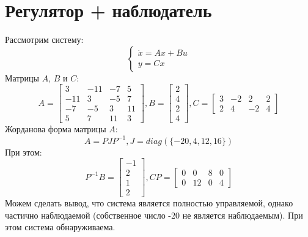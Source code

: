 \pagebreak

\section{Регулятор + наблюдатель}
Рассмотрим систему:
\begin{equation}
    \begin{cases}
        \dot x = Ax + Bu \\
        y = Cx
    \end{cases}
\end{equation}
Матрицы $A$, $B$ и $C$:
\begin{equation*}
    A = \begin{bmatrix}
        3 & -11 & -7 & 5 \\
        -11 & 3 & -5 & 7 \\
        -7 & -5 & 3 & 11 \\
        5 & 7 & 11 & 3
    \end{bmatrix},
    B = \begin{bmatrix}
        2 \\ 4 \\ 2 \\ 4
    \end{bmatrix},
    C = \begin{bmatrix}
        3 & -2 & 2 & 2 \\
        2 & 4 & -2 & 4
    \end{bmatrix}
\end{equation*}
Жорданова форма матрицы $A$:
\begin{equation*}
    A = PJP^{-1}, J = diag(\{-20,4,12,16\})
\end{equation*}
При этом:
\begin{equation*}
    P^{-1}B = \begin{bmatrix}
        -1\\2\\1\\2
    \end{bmatrix},
    CP= \begin{bmatrix}
        0 & 0 & 8 & 0 \\
        0 & 12 & 0 & 4
    \end{bmatrix}
\end{equation*}
Можем сделать вывод, что система является полностью управляемой, однако частично наблюдаемой 
(собственное число -20 не является наблюдаемым). При этом система обнаруживаема.

